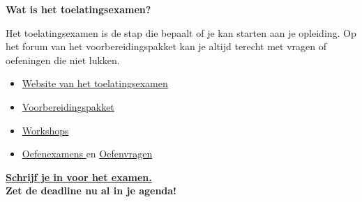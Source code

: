 \documentclass[12pt,a4paper]{article}
\begin{document}
\noindent
\begin{minipage}[t]{0.46\textwidth}

{\selectfont\bfseries\textcolor{kulaccent}{Wat is het toelatingsexamen?}}

\vspace{0.4em}

Het toelatingsexamen is de stap die bepaalt of je kan starten aan je opleiding. Op het forum van het voorbereidingspakket kan je altijd terecht met vragen of oefeningen die niet lukken.
\vspace{0.4em}

\begin{itemize}[leftmargin=1.5em, label=\textcolor{kulaccent}{\textbullet}]
    \setlength{\itemsep}{4pt}
    \setlength{\parskip}{0pt}

    \item \href{https://www.vlaanderen.be/onderwijs-en-vorming/toelatingsexamens/examenonderdelen#sb-leerstofoverzicht-en-voorbeeldvragen-bab7f247-4618-4177-8a50-a078b250b931}
{Website van het toelatingsexamen \scalebox{0.6}{\faLink}}
    
    \item \href{https://med.kuleuven.be/nl/studeren/toekomstigestudenten/voorbereiding-arts-tandarts/voorbereidingspakket/index.html}
{Voorbereidingspakket \scalebox{0.6}{\faLink}}

    \item \href{https://med.kuleuven.be/nl/studeren/toekomstigestudenten/voorbereiding-arts-tandarts/voorbereidingspakket/workshops}
{Workshops \scalebox{0.6}{\faLink}}

    \item \href{https://med.kuleuven.be/nl/studeren/toekomstigestudenten/voorbereiding-arts-tandarts/voorbereidingspakket/proefexamen}
{Oefenexamens \scalebox{0.6}{\faLink}} en \href{https://www.vlaanderen.be/onderwijs-en-vorming/toelatingsexamens/voorbereiden/proefexamen}
{Oefenvragen \scalebox{0.6}{\faLink}}
    
\end{itemize}

\begin{tcolorbox}[
    colback=kulblue,
    colframe=kulblue,
    boxrule=0pt,
    arc=0pt,
    width=\linewidth,
    left=3mm,
    right=3mm,
    top=3mm,
    bottom=3mm
]

\href{https://www.vlaanderen.be/onderwijs-en-vorming/toelatingsexamens/inschrijven#sb-inschrijven-voor-de-toelatingsexamens-arts-en-tandarts-ae58eff4-a28b-4463-99a3-ae8c5b43b336}
{\textbf{Schrijf je in voor het examen.} \scalebox{0.6}{\faLink}} \\ \textbf{Zet de deadline nu al in je agenda!}

\end{tcolorbox}



\end{minipage}
\end{document}
